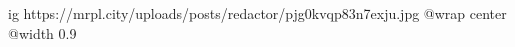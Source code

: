  
 
 
 
 

\ifcmt
  ig https://mrpl.city/uploads/posts/redactor/pjg0kvqp83n7exju.jpg
  @wrap center
  @width 0.9
\fi
